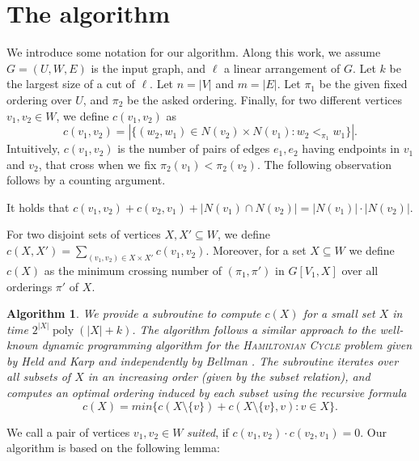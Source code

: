 \documentclass[a4paper,UKenglish,cleveref, autoref, thm-restate]{lipics-v2021}
\newtheorem{algorithm}{Algorithm}
\newcommand{\layerone}{\ensuremath{U}}
\newcommand{\layertwo}{\ensuremath{W}}
\begin{document}
\section{The algorithm}
We introduce some notation for our algorithm. Along this work, we assume $G=(\layerone,\layertwo, E)$ is the input graph, and $\ell$ a linear arrangement of $G$. Let $k$ be the largest size of a cut of $\ell$. Let $n = |V|$ and $m=|E|$.
Let $\pi_1$ be the given fixed ordering over $\layerone$, and $\pi_2$ be the asked ordering.
Finally, for two different vertices $v_1, v_2 \in \layertwo$, we define $c(v_1,v_2)$ as
\[c(v_1,v_2) = |\{(w_2, w_1)\in N(v_2)\times N(v_1)\colon w_2 <_{\pi_1} w_1\}|.\] 
Intuitively, $c(v_1,v_2)$ is the number of pairs of edges $e_1, e_2$ having endpoints in $v_1$ and $v_2$, that cross when we fix $\pi_2(v_1) < \pi_2(v_2)$. The following observation follows by a counting argument.
\begin{observation}
    It holds that $c(v_1,v_2)+ c(v_2,v_1) + |N(v_1)\cap N(v_2)| = |N(v_1)|\cdot |N(v_2)|.$
\end{observation}
For two disjoint sets of vertices $X,X'\subseteq W$, we define
$c(X,X') = \sum_{(v_1,v_2)\in X\times X'}c(v_1,v_2)$.
Moreover, for a set $X\subseteq \layertwo$ we define $c(X)$ as the minimum crossing number of $(\pi_1, \pi')$ in $G[V_1, X]$ over all orderings $\pi'$ of $X$.

\begin{algorithm}\label{alg:subroutine}
    We provide a subroutine to compute $c(X)$ for a small set $X$ in time $2^{|X|}\operatorname{poly}(|X|+k)$. The algorithm follows a similar approach to the well-known dynamic programming algorithm for the \textsc{Hamiltonian Cycle} problem given by Held and Karp \cite{DBLP:conf/acm/HeldK61} and independently by Bellman \cite{bellman1958combinatorial}. The subroutine iterates over all subsets of $X$ in an increasing order (given by the subset relation), and computes an optimal ordering induced by each subset using the recursive formula
    \[c(X) = min\{c(X\setminus\{v\}) + c(X\setminus \{v\}, v)\colon v \in X\}.\]    
\end{algorithm}

We call a pair of vertices $v_1, v_2 \in W$ \emph{suited}, if $c(v_1,v_2)\cdot c(v_2,v_1) = 0$. Our algorithm is based on the following lemma:
\end{document}
